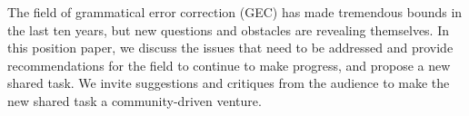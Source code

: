 The field of grammatical error correction (GEC) has made tremendous bounds in the last ten years, but new questions and obstacles are revealing themselves. In this position paper, we discuss the issues that need to be addressed and provide recommendations for the field to continue to make progress, and propose a new shared task. We invite suggestions and critiques from the audience to make the new shared task a community-driven venture.
